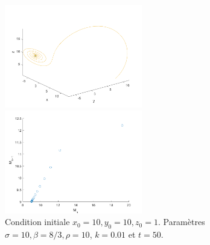 \documentclass[a4paper, 12pt]{report}
\begin{document}
\begin{figure}[H]
    \centering
    \begin{minipage}[t]{6cm}
        \centering
        \includegraphics[width=6cm]{images/lorenz10.png}
    \end{minipage}\hspace{1cm}
    \begin{minipage}[t]{6cm}
        \centering
        \includegraphics[width=6cm]{images/lorenz_m_10.png}
    \end{minipage}
    \caption{Condition initiale $x_0 = 10, y_0 = 10, z_0=1$. Paramètres $\sigma=10, \beta=8/3, \rho=10$, $k=0.01$ et $t=50$.}
\end{figure}
\end{document}

